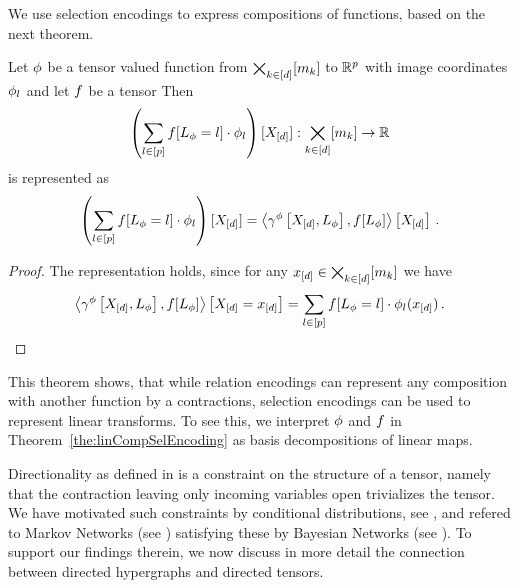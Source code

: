 We use selection encodings to express compositions of functions, based on the next theorem.

\begin{theorem}
    \label{the:linCompSelEncoding}
    Let $\phi$ be a tensor valued function from $\bigtimes_{k\in[d]}[m_{k}]$ to $\mathbb{R}^{p}$ with image coordinates $\phi_l$ and let $f$ be a tensor
    Then
    \[ \left(\sum_{l\in[p]}f[L_{\phi}=l]\cdot \phi_l \right) [X_{[d]}] : \bigtimes_{k\in[d]}[m_{k}] \rightarrow \mathbb{R} \]
    is represented as
    \[ \left(\sum_{l\in[p]}f[L_{\phi}=l]\cdot \phi_l \right) [X_{[d]}]
    = \left\langle \gamma^{\phi}\left[X_{[d]},L_{\phi}\right] , f[L_{\phi}]\right\rangle \left[ X_{[d]} \right] \, . \]
\end{theorem}
\begin{proof}
    The representation holds, since for any $x_{[d]}\in\bigtimes_{k\in[d]}[m_{k}]$ we have
    \begin{align*}
        \left\langle \gamma^{\phi}\left[X_{[d]},L_{\phi}\right] , f[L_{\phi}]\right\rangle \left[ X_{[d]}=x_{[d]} \right]
        = \sum_{l\in[p]}f[L_{\phi}=l]\cdot\phi_l(x_{[d]}) \, .
    \end{align*}
\end{proof}

This theorem shows, that while relation encodings can represent any composition with another function by a contractions, selection encodings can be used to represent linear transforms.
To see this, we interpret $\phi$ and $f$ in Theorem~\ref{the:linCompSelEncoding} as basis decompositions of linear maps.


Directionality as defined in  is a constraint on the structure of a tensor, namely that the contraction leaving only incoming variables open trivializes the tensor.
We have motivated such constraints by conditional distributions, see , and refered to Markov Networks (see ) satisfying these by Bayesian Networks (see ).
To support our findings therein, we now discuss in more detail the connection between directed hypergraphs and directed tensors.

